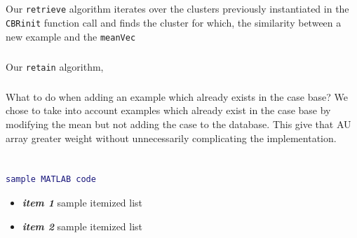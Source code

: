 \documentclass[a4paper,12pt,oneside,final]{report}
\newenvironment{changemargin}[2]{\begin{list}{}{%
\setlength{\topsep}{0pt}%
\setlength{\leftmargin}{0pt}%
\setlength{\rightmargin}{0pt}%
\setlength{\listparindent}{\parindent}%
\setlength{\itemindent}{\parindent}%
\setlength{\parsep}{0pt plus 1pt}%
\addtolength{\leftmargin}{#1}%
\addtolength{\rightmargin}{#2}%
}\item }{\end{list}}
\begin{document}
\paragraph{}
Our \verb+retrieve+ algorithm iterates over the clusters previously instantiated in the \verb+CBRinit+ function call and finds the cluster for which, the similarity between a new example and the \verb+meanVec+  
\paragraph{}
Our \verb+retain+ algorithm, 

\paragraph{}
What to do when adding an example which already exists in the case base?  We chose to take into account examples which already exist in the case base by modifying the mean but not adding the case to the database.  This give that AU array greater weight without unnecessarily complicating the implementation.

\paragraph{}

\chapter{}
\paragraph{}
\section{}
\paragraph{} 
\begin{changemargin}{-5mm}{-5mm}
\begin{lstlisting}[language=Matlab, frame=single]
sample MATLAB code
\end{lstlisting}
\end{changemargin}
\label{ch:build}
\begin{itemize}
\item {\bf \textit{item 1} } sample itemized list
\item {\bf \textit{item 2} } sample itemized list
\end{itemize}
\end{document}
